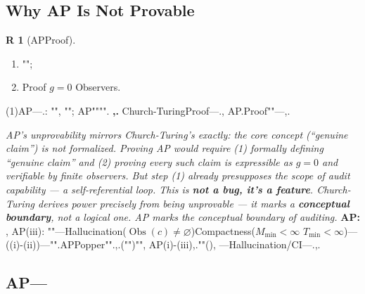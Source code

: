 \documentclass[12pt,a4paper]{article}
\theoremstyle{plain}
\theoremstyle{definition}
\newtheorem{remark}[theorem]Remark
\theoremstyle{remark}
\newcommand{\Null}{\varnothing}
\DeclareMathOperator{\ObsSet}{Obs}
\begin{document}
\subsection{Why AP Is Not Provable}
\begin{remark}[APProof]\label{rmk:unprovable}
\begin{enumerate}[label=(\arabic*)]
 \item ""; 
 \item Proof $g=0$ Observers.
\end{enumerate}
(1)AP---.: "", ""; AP"""".
\vspace{4pt}
\noindent
\textbf{,.} Church-TuringProof---., AP.Proof""---,.
\end{remark}
\vspace{4pt}
\noindent
\textit{AP's unprovability mirrors Church-Turing's exactly: the core concept (``genuine claim'') is not formalized. Proving AP would require (1) formally defining ``genuine claim'' and (2) proving every such claim is expressible as $g=0$ and verifiable by finite observers. But step (1) already presupposes the scope of audit capability --- a self-referential loop. This is \textbf{not a bug, it's a feature}. Church-Turing derives power precisely from being unprovable --- it marks a \textbf{conceptual boundary}, not a logical one. AP marks the conceptual boundary of auditing.}
\vspace{6pt}
\textbf{AP: }, AP(iii): ""---Hallucination($\ObsSet(c) \neq \Null$)Compactness($M_{\min} < \infty$ $T_{\min} < \infty$)---((i)-(ii))---"".APPopper"".\textit{},.("")"", AP(i)-(iii),.""(), ---Hallucination/CI---.,.
\subsection{AP---}
\end{document}
